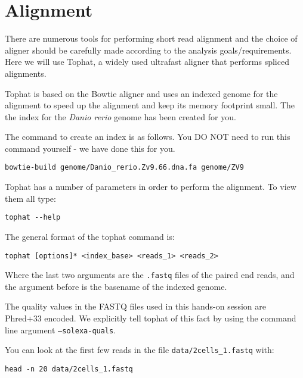 \section{Alignment}
There are numerous tools for performing short read alignment and the choice of aligner
should be carefully made according to the analysis goals/requirements. Here we will
use Tophat, a widely used ultrafast aligner that performs spliced alignments.

Tophat is based on the Bowtie aligner and uses an indexed genome for the
alignment to speed up the alignment and keep its memory footprint small. 
The the index for the \textit{Danio rerio} genome has been created for you. 

\begin{warning}
The command to create an index is as follows. You DO NOT need to run this command
yourself - we have done this for you.
\begin{lstlisting}
bowtie-build genome/Danio_rerio.Zv9.66.dna.fa genome/ZV9
\end{lstlisting}
\end{warning}

\begin{steps}
Tophat has a number of parameters in order to perform the alignment. To view them all type:
\begin{lstlisting}
tophat --help
\end{lstlisting}
\end{steps}

\begin{information}
The general format of the tophat command is:
\begin{lstlisting}[style=command_syntax]
tophat [options]* <index_base> <reads_1> <reads_2>
\end{lstlisting}

Where the last two arguments are the \texttt{.fastq} files of the paired end
reads, and the argument before is the basename of the indexed genome.
\end{information}

\begin{note}
The quality values in the FASTQ files used in this hands-on session are Phred+33
encoded. We explicitly tell tophat of this fact by using the command line
argument \texttt{--solexa-quals}.
\end{note}

\begin{information}
You can look at the first few reads in the file \texttt{data/2cells\_1.fastq} with:
 
\begin{lstlisting}
head -n 20 data/2cells_1.fastq
\end{lstlisting}
\end{information}

